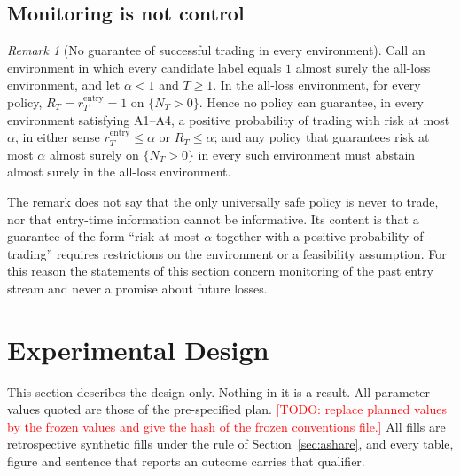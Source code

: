 \documentclass[11pt]{article}
\theoremstyle{remark}
\newtheorem{remark}{Remark}
\newcommand{\todo}[1]{\textcolor{red}{[TODO: #1]}}
\newcommand{\rentry}{r_T^{\mathrm{entry}}}
\begin{document}
\subsection{Monitoring is not control}

\begin{remark}[No guarantee of successful trading in every environment]
\label{rem:nocontrol}
Call an environment in which every candidate label equals $1$ almost surely the all-loss
environment, and let $\alpha<1$ and $T\ge1$. In the all-loss environment, for every policy,
$R_T=\rentry=1$ on $\{N_T>0\}$. Hence no policy can guarantee, in every environment satisfying
A1--A4, a positive probability of trading with risk at most $\alpha$, in either sense
$\rentry\le\alpha$ or $R_T\le\alpha$; and any policy that guarantees risk at most $\alpha$
almost surely on $\{N_T>0\}$ in every such environment must abstain almost surely in the
all-loss environment.
\end{remark}

The remark does not say that the only universally safe policy is never to trade, nor that
entry-time information cannot be informative. Its content is that a guarantee of the form ``risk
at most $\alpha$ together with a positive probability of trading'' requires restrictions on the
environment or a feasibility assumption. For this reason the statements of this section concern
monitoring of the past entry stream and never a promise about future losses.

\section{Experimental Design}
\label{sec:design}

This section describes the design only. Nothing in it is a result. All parameter values quoted
are those of the pre-specified plan.
\todo{replace planned values by the frozen values and give the hash of the frozen conventions
file.}
All fills are retrospective synthetic fills under the rule of Section~\ref{sec:ashare}, and
every table, figure and sentence that reports an outcome carries that qualifier.
\end{document}

